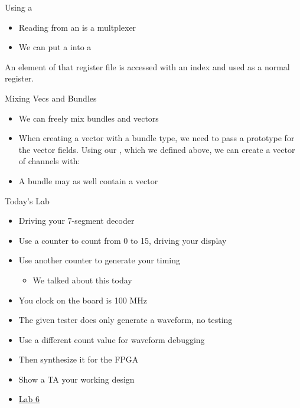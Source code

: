 \begin{frame}[fragile]{Using a }
\begin{itemize}
\item Reading from an  is a multplexer
\item We can put a  into a 
\end{itemize}
\noindent An element of that register file is accessed with an index and used as a normal register.

\end{frame}


\begin{frame}[fragile]{Mixing Vecs and Bundles}
\begin{itemize}
\item We can freely mix bundles and vectors
\item When creating a vector with a bundle
type, we need to pass a prototype for the vector fields. Using our
, which we defined above, we can create a vector of channels with:
\end{itemize}
\begin{itemize}
\item A bundle may as well contain a vector
\end{itemize}
\end{frame}

\begin{frame}[fragile]{Today's Lab}
\begin{itemize}
\item Driving your 7-segment decoder
\item Use a counter to count from 0 to 15, driving your display
\item Use another counter to generate your timing
\begin{itemize}
\item We talked about this today
\end{itemize}
\item You clock on the board is 100 MHz
\item The given tester does only generate a waveform, no testing
\item Use a different count value for waveform debugging
\item Then synthesize it for the FPGA
\item Show a TA your working design
\item \href{https://github.com/schoeberl/chisel-lab/tree/master/lab6}{Lab 6}
\end{itemize}
\end{frame}

